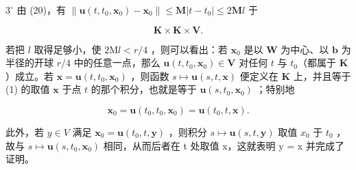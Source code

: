 \(3^{\circ}\) 由 (20)，有 \(\|\mathbf{u}(t, t_{0}, \mathbf{x}_{0}) - \mathbf{x}_{0}\| \leqslant \mathbf{M} |t - t_{0}| \leqslant 2\mathbf{M}l\) 于

\[
\mathbf {K} \times \mathbf {K} \times \mathbf {V}.
\]

若把 \(l\) 取得足够小，使 \(2\mathrm{M}l < r / 4\) ，则可以看出：若 \(\mathbf{x}_0\) 是以 \(\mathbf{W}\) 为中心、以 \(\mathbf{b}\) 为半径的开球 \(r / 4\) 中的任意一点，那么 \(\mathbf{u}(t,t_0,\mathbf{x}_0)\in \mathbf{V}\) 对任何 \(t\) 与 \(t_0\)（都属于 \(\mathbf{K}\) ）成立。若 \(\mathbf{x} = \mathbf{u}(t,t_0,\mathbf{x}_0)\) ，则函数 \(s\mapsto \mathbf{u}(s,t,\mathbf{x})\) 便定义在 \(\mathbf{K}\) 上，并且等于 (1) 的取值 \(\mathbf{x}\) 于点 \(t\) 的那个积分，也就是等于 \(\mathbf{u}(s,t_0,\mathbf{x}_0)\) ；特别地

\[
\mathbf {x} _ {0} = \mathbf {u} (t _ {0}, t _ {0}, \mathbf {x} _ {0}) = \mathbf {u} (t _ {0}, t, \mathbf {x}).
\]

此外，若 \(y \in V\) 满足 \(\mathbf{x}_{0} = \mathbf{u}(t_{0}, t, \mathbf{y})\) ，则积分 \(s \mapsto \mathbf{u}(s, t, \mathbf{y})\) 取值 \(x_{0}\) 于 \(t_{0}\) ，故与 \(s \mapsto \mathbf{u}(s, t_{0}, \mathbf{x}_{0})\) 相同，从而后者在 t 处取值 x，这就表明 y = x 并完成了证明。

